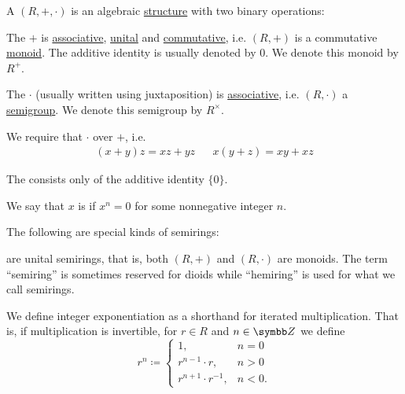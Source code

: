 \begin{definition}\label{def:semiring}
  A  \( (R, +, \cdot) \) is an algebraic \hyperref[def:algebraic_theory]{structure} with two binary operations:
  \begin{DefEnum}[series=def:semiring]
     The  \( + \) is \hyperref[def:magma/associative]{associative}, \hyperref[def:unital_magma]{unital} and \hyperref[def:magma/commutative]{commutative}, i.e. \( (R, +) \) is a commutative \hyperref[def:unital_magma/associative]{monoid}. The additive identity is usually denoted by \( 0 \). We denote this monoid by \( R^+ \).

     The  \( \cdot \) (usually written using juxtaposition) is \hyperref[def:magma/associative]{associative}, i.e. \( (R, \cdot) \) a \hyperref[def:magma/associative]{semigroup}. We denote this semigroup by \( R^\times \).

     We require that \( \cdot \)  over \( + \), i.e.
    \begin{align}\label{eq:def:semiring/distributivity}
      (x + y)z = xz + yz
      &&
      x(y + z) = xy + xz
    \end{align}
  \end{DefEnum}

  The  consists only of the additive identity \( \{ 0 \} \).

  We say that \( x \) is  if \( x^n = 0 \) for some nonnegative integer \( n \).

  The following are special kinds of semirings:
  \begin{DefEnum}[resume=def:semiring]
      are unital semirings, that is, both \( (R, +) \) and \( (R, \cdot) \) are monoids. The term \enquote{semiring} is sometimes reserved for dioids while \enquote{hemiring} is used for what we call semirings.

    We define integer exponentiation as a shorthand for iterated multiplication. That is, if multiplication is invertible, for \( r \in R \) and \( n \in \BZ \) we define
    \begin{equation*}
      r^n \coloneqq \begin{cases}
        1,                      & n = 0  \\
        r^{n - 1} \cdot r,      & n > 0  \\
        r^{n + 1} \cdot r^{-1}, & n < 0.
      \end{cases}
    \end{equation*}


\end{DefEnum}
\end{definition}
